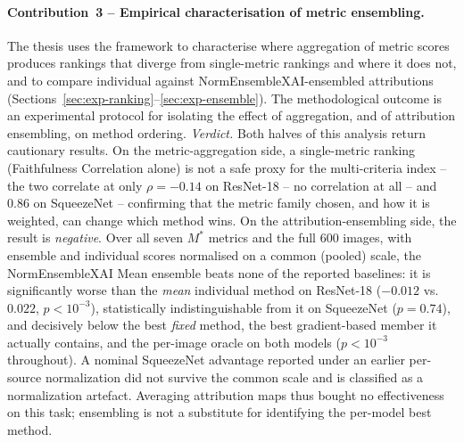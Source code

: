 \paragraph{Contribution~3 -- Empirical characterisation of metric ensembling.}
The thesis uses the framework to characterise where aggregation of metric
scores produces rankings that diverge from single-metric rankings and where it
does not, and to compare individual against NormEnsembleXAI-ensembled
attributions (Sections~\ref{sec:exp-ranking}--\ref{sec:exp-ensemble}). The
methodological outcome is an experimental protocol for isolating the effect of
aggregation, and of attribution ensembling, on method ordering.
\emph{Verdict.} Both halves of this analysis return cautionary results. On the
metric-aggregation side, a single-metric ranking (Faithfulness Correlation
alone) is not a safe proxy for the multi-criteria index -- the two correlate at
only $\rho = -0.14$ on ResNet-18 -- no correlation at all -- and $0.86$ on
SqueezeNet -- confirming that the
metric family chosen, and how it is weighted, can change which method wins. On
the attribution-ensembling side, the result is \emph{negative}. Over all
seven $M^{*}$ metrics and the full 600 images, with ensemble and individual
scores normalised on a common (pooled) scale, the NormEnsembleXAI Mean
ensemble beats none of the reported baselines: it is significantly worse
than the \emph{mean} individual method on ResNet-18 ($-0.012$ vs.\ $0.022$,
$p < 10^{-3}$), statistically indistinguishable from it on SqueezeNet
($p = 0.74$), and decisively below the best \emph{fixed} method, the best
gradient-based member it actually contains, and the per-image oracle on both
models ($p < 10^{-3}$ throughout). A nominal SqueezeNet advantage reported
under an earlier per-source normalization did not survive the common scale
and is classified as a normalization artefact. Averaging attribution maps
thus bought no effectiveness on this task; ensembling is not a substitute
for identifying the per-model best method.

